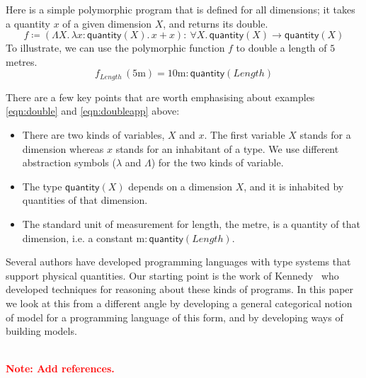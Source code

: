\documentclass[a4paper,UKenglish]{lipics}
\newcommand\note[1]{{ \bf \textcolor{red} {\vspace{2mm}\; \\ Note: #1\\}}}
\newcommand{\msf}[1]{\mathsf{#1}} %
\newcommand{\qnt}{\msf{quantity}}
\newcommand{\lengthDim}{\mathit{Length}}
\newcommand{\Dvar}{X}
\begin{document}
Here is a simple polymorphic program that is defined for all dimensions; it takes a quantity $x$ of a given dimension $X$, and returns its double.
\begin{equation}
f\coloneqq (\Lambda X.\,\lambda x:\qnt(X).\,x+x)
:\ \forall X.\,\qnt(X)\to \qnt(X)
\label{eqn:double}
\end{equation}
To illustrate, we can use the polymorphic function $f$ to double a length of $5$ metres.
\begin{equation}
f_\lengthDim\,(5\mathrm{m})=
10\mathrm{m}:\qnt(\lengthDim)
\label{eqn:doubleapp}
\end{equation}

\noindent There are a few key points that are worth emphasising about examples \eqref{eqn:double} and \eqref{eqn:doubleapp} above:
\begin{itemize}
\item There are two kinds of variables, $\Dvar$ and $x$. The first variable $\Dvar$ stands for a dimension whereas $x$ stands for an inhabitant of a type. We use different abstraction symbols ($\lambda$ and $\Lambda$) for the two kinds of variable.
\item The type $\qnt(\Dvar)$ depends on a dimension $\Dvar$, and it is inhabited by quantities of that dimension.
\item The standard unit of measurement for length, the metre, is a quantity of that dimension, i.e. a constant $\mathrm m:\qnt(\lengthDim)$.
\end{itemize}

Several authors have developed programming languages with type systems
that support physical quantities. Our starting point is the work of
Kennedy~\cite{Kennedy:1997:RPU:263699.263761} who developed techniques
for reasoning about these kinds of programs. In this paper we look at
this from a different angle by developing a general categorical notion
of model for a programming language of this form, and by developing
ways of building models.

\note{Add references.}
\end{document}
